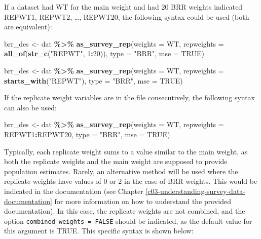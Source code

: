 \documentclass[
]{krantz}
\makeatletter
\newenvironment{Shaded}{\begin{snugshade}}{\end{snugshade}}
\newcommand{\AttributeTok}[1]{\textcolor[rgb]{0.27,0.27,0.27}{#1}}
\newcommand{\ConstantTok}[1]{\textcolor[rgb]{0.37,0.37,0.37}{#1}}
\newcommand{\DecValTok}[1]{\textcolor[rgb]{0.06,0.06,0.06}{#1}}
\newcommand{\FunctionTok}[1]{\textcolor[rgb]{0.27,0.27,0.27}{\textbf{#1}}}
\newcommand{\NormalTok}[1]{#1}
\newcommand{\OtherTok}[1]{\textcolor[rgb]{0.37,0.37,0.37}{#1}}
\newcommand{\SpecialCharTok}[1]{\textcolor[rgb]{0.43,0.43,0.43}{\textbf{#1}}}
\newcommand{\StringTok}[1]{\textcolor[rgb]{0.5,0.5,0.5}{#1}}
\newenvironment{kframe}{%
\medskip{}
\setlength{\fboxsep}{.8em}
 \def\at@end@of@kframe{}%
 \ifinner\ifhmode%
  \def\at@end@of@kframe{\end{minipage}}%
  \begin{minipage}{\columnwidth}%
 \fi\fi%
 \def\FrameCommand##1{\hskip\@totalleftmargin \hskip-\fboxsep
 \colorbox{shadecolor}{##1}\hskip-\fboxsep
     \hskip-\linewidth \hskip-\@totalleftmargin \hskip\columnwidth}%
 \MakeFramed {\advance\hsize-\width
   \@totalleftmargin\z@ \linewidth\hsize
   \@setminipage}}%
 {\par\unskip\endMakeFramed%
 \at@end@of@kframe}
\renewenvironment{Shaded}{\begin{kframe}}{\end{kframe}}
\makeatother
\begin{document}
If a dataset had WT for the main weight and had 20 BRR weights indicated REPWT1, REPWT2, \ldots, REPWT20, the following syntax could be used (both are equivalent):

\begin{Shaded}
\begin{Highlighting}[]
\NormalTok{brr\_des }\OtherTok{\textless{}{-}}\NormalTok{ dat }\SpecialCharTok{\%\textgreater{}\%}
  \FunctionTok{as\_survey\_rep}\NormalTok{(}\AttributeTok{weights =}\NormalTok{ WT,}
                \AttributeTok{repweights =} \FunctionTok{all\_of}\NormalTok{(}\FunctionTok{str\_c}\NormalTok{(}\StringTok{"REPWT"}\NormalTok{, }\DecValTok{1}\SpecialCharTok{:}\DecValTok{20}\NormalTok{)),}
                \AttributeTok{type =} \StringTok{"BRR"}\NormalTok{,}
                \AttributeTok{mse =} \ConstantTok{TRUE}\NormalTok{)}

\NormalTok{brr\_des }\OtherTok{\textless{}{-}}\NormalTok{ dat }\SpecialCharTok{\%\textgreater{}\%}
  \FunctionTok{as\_survey\_rep}\NormalTok{(}\AttributeTok{weights =}\NormalTok{ WT,}
                \AttributeTok{repweights =} \FunctionTok{starts\_with}\NormalTok{(}\StringTok{"REPWT"}\NormalTok{),}
                \AttributeTok{type =} \StringTok{"BRR"}\NormalTok{,}
                \AttributeTok{mse =} \ConstantTok{TRUE}\NormalTok{)}
\end{Highlighting}
\end{Shaded}

If the replicate weight variables are in the file consecutively, the following syntax can also be used:

\begin{Shaded}
\begin{Highlighting}[]
\NormalTok{brr\_des }\OtherTok{\textless{}{-}}\NormalTok{ dat }\SpecialCharTok{\%\textgreater{}\%}
  \FunctionTok{as\_survey\_rep}\NormalTok{(}\AttributeTok{weights =}\NormalTok{ WT,}
                \AttributeTok{repweights =}\NormalTok{ REPWT1}\SpecialCharTok{:}\NormalTok{REPWT20,}
                \AttributeTok{type =} \StringTok{"BRR"}\NormalTok{,}
                \AttributeTok{mse =} \ConstantTok{TRUE}\NormalTok{)}
\end{Highlighting}
\end{Shaded}

Typically, each replicate weight sums to a value similar to the main weight, as both the replicate weights and the main weight are supposed to provide population estimates. Rarely, an alternative method will be used where the replicate weights have values of 0 or 2 in the case of BRR weights. This would be indicated in the documentation (see Chapter \ref{c03-understanding-survey-data-documentation} for more information on how to understand the provided documentation). In this case, the replicate weights are not combined, and the option \texttt{combined\_weights\ =\ FALSE} should be indicated, as the default value for this argument is TRUE. This specific syntax is shown below:
\end{document}
